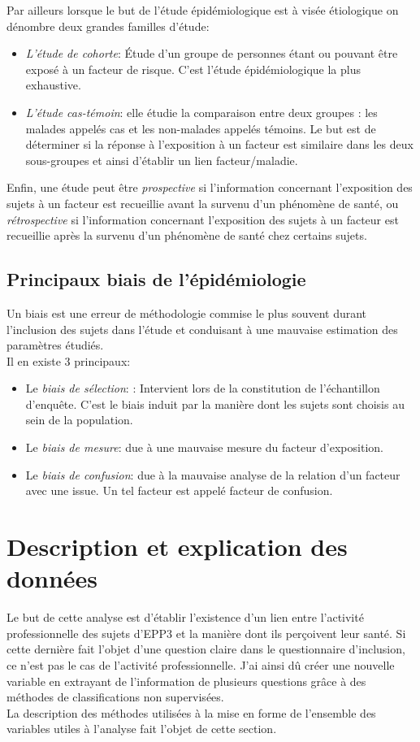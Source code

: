 \documentclass{book}
\begin{document}
\bigskip

\noindent
Par ailleurs lorsque le but de l'étude épidémiologique est à visée étiologique on dénombre deux grandes familles d'étude:
\begin{itemize}
\item \textit{L'étude de cohorte}: Étude d'un groupe de personnes étant ou pouvant être exposé à un facteur de risque. C'est l'étude épidémiologique la plus exhaustive.
\item \textit{L'étude cas-témoin}: elle étudie la comparaison entre deux groupes : les malades appelés cas et les non-malades appelés témoins. Le but est de déterminer si la réponse à l'exposition à un facteur est similaire dans les deux sous-groupes et ainsi d'établir un lien facteur/maladie.
\end{itemize}

\bigskip

\noindent
Enfin, une étude peut être \textit{prospective} si  l'information concernant l'exposition des sujets à un facteur est recueillie avant la survenu d'un phénomène de  santé, ou \textit{rétrospective} si l'information concernant l'exposition des sujets à un facteur est recueillie après  la survenu d'un phénomène de  santé chez certains sujets.

\subsection{Principaux biais de l'épidémiologie}
\noindent
Un biais est une erreur de méthodologie commise le plus souvent durant l'inclusion des sujets dans l'étude et conduisant à une mauvaise estimation des paramètres étudiés.\\

\noindent
Il en existe 3 principaux:
\begin{itemize}
\item Le \textit{biais de sélection}: : Intervient lors de la constitution de l'échantillon d'enquête. C'est le biais induit par la manière dont les sujets sont choisis au sein de la population. 
\item Le \textit{biais de mesure}: due à une mauvaise mesure du facteur d'exposition.
\item Le \textit{biais de confusion}: due à la mauvaise analyse de la relation d'un facteur avec une issue. Un tel facteur est appelé facteur de confusion.
\end{itemize}

\section{Description et explication des données}
\noindent
Le but de cette analyse est d'établir l'existence d'un lien entre l'activité professionnelle des sujets d'EPP3 et la manière dont ils perçoivent leur santé. Si cette dernière fait l'objet d'une question claire dans le questionnaire d'inclusion, ce n'est pas le cas de l'activité professionnelle. J'ai ainsi dû créer une nouvelle variable en extrayant de l'information de plusieurs questions grâce à des méthodes de classifications non supervisées.\\
La description des méthodes utilisées à la mise en forme de l'ensemble des variables utiles à l'analyse fait l'objet de cette section.
\end{document}

